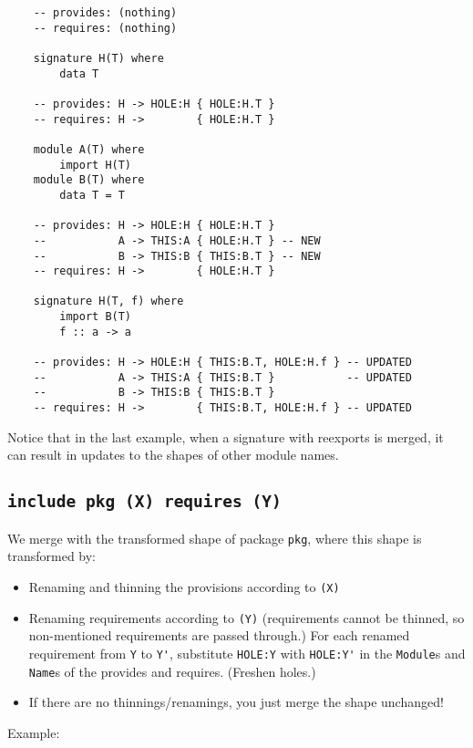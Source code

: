 \documentclass{article}
\begin{document}
\begin{verbatim}
    -- provides: (nothing)
    -- requires: (nothing)

    signature H(T) where
        data T

    -- provides: H -> HOLE:H { HOLE:H.T }
    -- requires: H ->        { HOLE:H.T }

    module A(T) where
        import H(T)
    module B(T) where
        data T = T

    -- provides: H -> HOLE:H { HOLE:H.T }
    --           A -> THIS:A { HOLE:H.T } -- NEW
    --           B -> THIS:B { THIS:B.T } -- NEW
    -- requires: H ->        { HOLE:H.T }

    signature H(T, f) where
        import B(T)
        f :: a -> a

    -- provides: H -> HOLE:H { THIS:B.T, HOLE:H.f } -- UPDATED
    --           A -> THIS:A { THIS:B.T }           -- UPDATED
    --           B -> THIS:B { THIS:B.T }
    -- requires: H ->        { THIS:B.T, HOLE:H.f } -- UPDATED
\end{verbatim}

Notice that in the last example, when a signature with reexports is merged,
it can result in updates to the shapes of other module names.

\newpage

\subsection{\texttt{include pkg (X) requires (Y)}}

We merge with the transformed shape of package \verb|pkg|, where this
shape is transformed by:

\begin{itemize}
    \item Renaming and thinning the provisions according to \verb|(X)|
    \item Renaming requirements according to \verb|(Y)| (requirements cannot
          be thinned, so non-mentioned requirements are passed through.)
          For each renamed requirement from \verb|Y| to \verb|Y'|,
          substitute \verb|HOLE:Y| with \verb|HOLE:Y'| in the
          \verb|Module|s and \verb|Name|s of the provides and requires.
          (Freshen holes.)
    \item If there are no thinnings/renamings, you just merge the
          shape unchanged!
\end{itemize}

\noindent Example:
\end{document}
